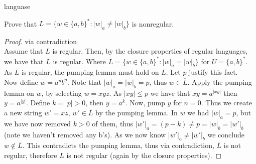 \documentclass[12pt]{jhwhw}
\begin{document}
\problem{}languase

	Prove that $L = \{w\in\{a,b\}^* : |w|_a \neq |w|_b \}$ is nonregular.

\solution

	\begin{proof} via contradiction \\
		Assume that $L$ is regular. Then, by the closure properties
		of regular languages, we have that $\overline{L}$ is regular.
		Where $\overline{L} = \{w\in \{a,b\}^* : |w|_a = |w|_b\}$ for $U=\{a,b\}^*$.
		As $\overline{L}$ is regular, the pumping lemma must hold on
		$\overline{L}$. Let $p$ justify this fact. \\
		Now define $w = a^pb^p$. Note that $|w|_a = |w|_b = p$, thus $w\in \overline{L}$.
		Apply the pumping lemma on $w$, by selecting $w=xyz$.
		As $|xy| \leq p$ we have that $xy = a^{|xy|}$ then $y=a^{|y|}$.
		Define $k = |p| > 0$, then $y = a^k$. Now, pump $y$ for $n=0$.
		Thus we create a new string $w' = xz$, $w'\in \overline{L}$ by the pumping lemma.
		In $w$ we had $|w|_a = p$, but we have now removed $k>0$ of them, thus
		$|w'|_a = (p-k) \neq p = |w|_b = |w'|_b$ (note we haven't removed any b's).
		As we now know $|w'|_a \neq |w'|_b$ we conclude $w\not\in \overline{L}$.
		This contradicts the pumping lemma, thus via contradiction, $\overline{L}$ is 
		not regular, therefore $L$ is not regular (again by the closure properties).
	\end{proof}
\end{document}
